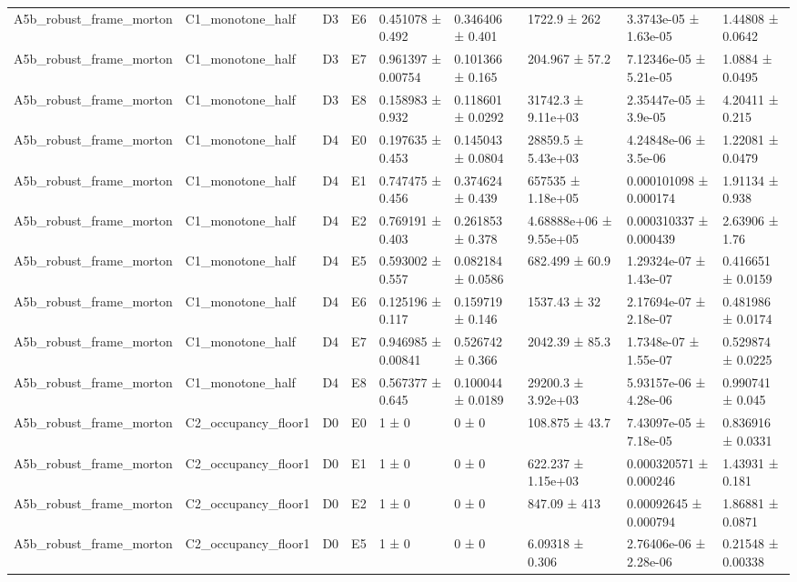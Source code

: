 \begin{table}
\begin{tabular}{lllllllll}
A5b\_robust\_frame\_morton & C1\_monotone\_half & D3 & E6 & 0.451078 ± 0.492 & 0.346406 ± 0.401 & 1722.9 ± 262 & 3.3743e-05 ± 1.63e-05 & 1.44808 ± 0.0642 \\
A5b\_robust\_frame\_morton & C1\_monotone\_half & D3 & E7 & 0.961397 ± 0.00754 & 0.101366 ± 0.165 & 204.967 ± 57.2 & 7.12346e-05 ± 5.21e-05 & 1.0884 ± 0.0495 \\
A5b\_robust\_frame\_morton & C1\_monotone\_half & D3 & E8 & 0.158983 ± 0.932 & 0.118601 ± 0.0292 & 31742.3 ± 9.11e+03 & 2.35447e-05 ± 3.9e-05 & 4.20411 ± 0.215 \\
A5b\_robust\_frame\_morton & C1\_monotone\_half & D4 & E0 & 0.197635 ± 0.453 & 0.145043 ± 0.0804 & 28859.5 ± 5.43e+03 & 4.24848e-06 ± 3.5e-06 & 1.22081 ± 0.0479 \\
A5b\_robust\_frame\_morton & C1\_monotone\_half & D4 & E1 & 0.747475 ± 0.456 & 0.374624 ± 0.439 & 657535 ± 1.18e+05 & 0.000101098 ± 0.000174 & 1.91134 ± 0.938 \\
A5b\_robust\_frame\_morton & C1\_monotone\_half & D4 & E2 & 0.769191 ± 0.403 & 0.261853 ± 0.378 & 4.68888e+06 ± 9.55e+05 & 0.000310337 ± 0.000439 & 2.63906 ± 1.76 \\
A5b\_robust\_frame\_morton & C1\_monotone\_half & D4 & E5 & 0.593002 ± 0.557 & 0.082184 ± 0.0586 & 682.499 ± 60.9 & 1.29324e-07 ± 1.43e-07 & 0.416651 ± 0.0159 \\
A5b\_robust\_frame\_morton & C1\_monotone\_half & D4 & E6 & 0.125196 ± 0.117 & 0.159719 ± 0.146 & 1537.43 ± 32 & 2.17694e-07 ± 2.18e-07 & 0.481986 ± 0.0174 \\
A5b\_robust\_frame\_morton & C1\_monotone\_half & D4 & E7 & 0.946985 ± 0.00841 & 0.526742 ± 0.366 & 2042.39 ± 85.3 & 1.7348e-07 ± 1.55e-07 & 0.529874 ± 0.0225 \\
A5b\_robust\_frame\_morton & C1\_monotone\_half & D4 & E8 & 0.567377 ± 0.645 & 0.100044 ± 0.0189 & 29200.3 ± 3.92e+03 & 5.93157e-06 ± 4.28e-06 & 0.990741 ± 0.045 \\
A5b\_robust\_frame\_morton & C2\_occupancy\_floor1 & D0 & E0 & 1 ± 0 & 0 ± 0 & 108.875 ± 43.7 & 7.43097e-05 ± 7.18e-05 & 0.836916 ± 0.0331 \\
A5b\_robust\_frame\_morton & C2\_occupancy\_floor1 & D0 & E1 & 1 ± 0 & 0 ± 0 & 622.237 ± 1.15e+03 & 0.000320571 ± 0.000246 & 1.43931 ± 0.181 \\
A5b\_robust\_frame\_morton & C2\_occupancy\_floor1 & D0 & E2 & 1 ± 0 & 0 ± 0 & 847.09 ± 413 & 0.00092645 ± 0.000794 & 1.86881 ± 0.0871 \\
A5b\_robust\_frame\_morton & C2\_occupancy\_floor1 & D0 & E5 & 1 ± 0 & 0 ± 0 & 6.09318 ± 0.306 & 2.76406e-06 ± 2.28e-06 & 0.21548 ± 0.00338 \\

\end{tabular}
\end{table}
